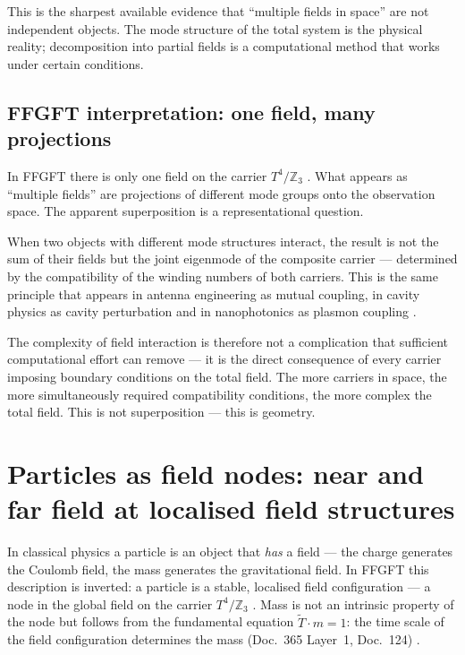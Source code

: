 This is the sharpest available evidence that ``multiple fields in space''
are not independent objects. The mode structure of the total system is
the physical reality; decomposition into partial fields is a computational
method that works under certain conditions.

\subsection*{FFGFT interpretation: one field, many projections}

In FFGFT there is only one field on the carrier $T^4/\mathbb{Z}_3$
\SetzM. What appears as ``multiple fields'' are projections of different
mode groups onto the observation space. The apparent superposition is a
representational question.

When two objects with different mode structures interact, the result is not
the sum of their fields but the joint eigenmode of the composite carrier
--- determined by the compatibility of the winding numbers of both carriers.
This is the same principle that appears in antenna engineering as mutual
coupling, in cavity physics as cavity perturbation and in nanophotonics
as plasmon coupling \SM.

The complexity of field interaction is therefore not a complication that
sufficient computational effort can remove --- it is the direct consequence
of every carrier imposing boundary conditions on the total field. The more
carriers in space, the more simultaneously required compatibility conditions,
the more complex the total field. This is not superposition --- this is
geometry.

\section{Particles as field nodes: near and far field at localised field structures}

In classical physics a particle is an object that \emph{has} a field ---
the charge generates the Coulomb field, the mass generates the gravitational
field. In FFGFT this description is inverted: a particle is a stable,
localised field configuration --- a node in the global field on the carrier
$T^4/\mathbb{Z}_3$ \SetzM. Mass is not an intrinsic property of the node
but follows from the fundamental equation $\tilde{T}\cdot m=1$: the time
scale of the field configuration determines the mass (Doc.~365 Layer~1,
Doc.~124) \KM.

